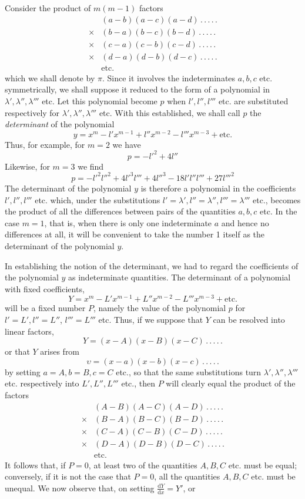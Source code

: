 Consider the product of $m(m-1)$ factors
\[
\begin{aligned}
&(a-b)(a-c)(a-d)\, .\, .\, .\, .\, .\\
\times{}&(b-a)(b-c)(b-d)\, .\, .\, .\, .\, .\\
\times{}&(c-a)(c-b)(c-d)\, .\, .\, .\, .\, .\\
\times{}&(d-a)(d-b)(d-c)\, .\, .\, .\, .\, .\\
&\text{etc.}
\end{aligned}
\]
which we shall denote by $\pi$. Since it involves the indeterminates $a,b,c$ etc. symmetrically, we shall suppose it reduced to the form of a polynomial in $\lambda',\lambda'',\lambda'''$ etc. Let this polynomial become $p$ when $l',l'',l'''$ etc. are substituted respectively for $\lambda',\lambda'',\lambda'''$ etc. With this established, we shall call $p$ the \textit{determinant} of the polynomial
\[
y=x^m-l'x^{m-1}+l''x^{m-2}-l'''x^{m-3}+\text{etc.}
\]
Thus, for example, for $m=2$ we have
\[
p=-{l'}^2+4l''
\]
Likewise, for $m=3$ we find
\[
p=-{l'}^2{l''}^2+4{l'}^3l'''+4{l''}^3-18l'l''l'''+27{l'''}^2
\]
The determinant of the polynomial $y$ is therefore a polynomial in the coefficients $l',l'',l'''$ etc. which, under the substitutions $l'=\lambda',l''=\lambda'',l'''=\lambda'''$ etc., becomes the product of all the differences between pairs of the quantities $a,b,c$ etc. In the case $m=1$, that is, when there is only one indeterminate $a$ and hence no differences at all, it will be convenient to take the number 1 itself as the determinant of the polynomial $y$.

In establishing the notion of the determinant, we had to regard the coefficients of the polynomial $y$ as indeterminate quantities. The determinant of a polynomial with fixed coefficients,
\[
Y=x^m-L'x^{m-1}+L''x^{m-2}-L'''x^{m-3}+\text{etc.}
\]
will be a fixed number $P$, namely the value of the polynomial $p$ for $l'=L',l''=L''$, $l'''=L'''$ etc. Thus, if we suppose that $Y$ can be resolved into linear factors,
\[
Y=(x-A)(x-B)(x-C)\, .\, .\, .\, .\, .
\]
or that $Y$ arises from
\[
\upsilon=(x-a)(x-b)(x-c)\, .\, .\, .\, .\, .
\]
by setting $a=A,b=B,c=C$ etc., so that the same substitutions turn $\lambda',\lambda'',\lambda'''$ etc. respectively into $L',L'',L'''$ etc., then $P$ will clearly equal the product of the factors
\[
\begin{aligned}
&(A-B)(A-C)(A-D)\, .\, .\, .\, .\, .\\
\times{}&(B-A)(B-C)(B-D)\, .\, .\, .\, .\, .\\
\times{}&(C-A)(C-B)(C-D)\, .\, .\, .\, .\, .\\
\times{}&(D-A)(D-B)(D-C)\, .\, .\, .\, .\, .\\
&\text{etc.}
\end{aligned}
\]
It follows that, if $P=0$, at least two of the quantities $A,B,C$ etc. must be equal; conversely, if it is not the case that $P=0$, all the quantities $A,B,C$ etc. must be unequal. We now observe that, on setting $\frac{\mathrm dY}{\mathrm dx}=Y'$, or

